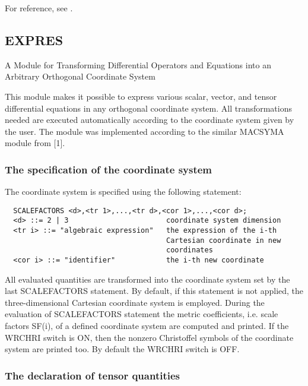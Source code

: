 For reference, see \cite{Liska:90}.



\subsection{EXPRES}




                A Module for Transforming Differential
         Operators and Equations into an Arbitrary Orthogonal
                           Coordinate System



     This module  makes it  possible to  express various scalar, vector,
and tensor differential equations  in any  orthogonal coordinate system.
All transformations  needed are  executed automatically according to the
coordinate  system  given  by  the  user.  The  module  was  implemented
according to the similar MACSYMA module from [1].


\subsubsection{The specification of the coordinate system}

The coordinate system is specified using the following statement:
\begin{verbatim}
  SCALEFACTORS <d>,<tr 1>,...,<tr d>,<cor 1>,...,<cor d>;
  <d> ::= 2 | 3                       coordinate system dimension
  <tr i> ::= "algebraic expression"   the expression of the i-th
                                      Cartesian coordinate in new
                                      coordinates
  <cor i> ::= "identifier"            the i-th new coordinate
\end{verbatim}
All evaluated  quantities are transformed into the coordinate system set
by the last SCALEFACTORS statement. By default, if this statement is not
applied, the  three-dimensional Cartesian coordinate system is employed.
During the evaluation of SCALEFACTORS statement the metric coefficients,
i.e. scale  factors SF(i),  of a  defined coordinate system are computed
and printed. If the WRCHRI switch  is ON,  then the  nonzero Christoffel
symbols of the coordinate system are printed too. By  default the WRCHRI
switch is OFF.

\subsubsection{The declaration of tensor quantities}

